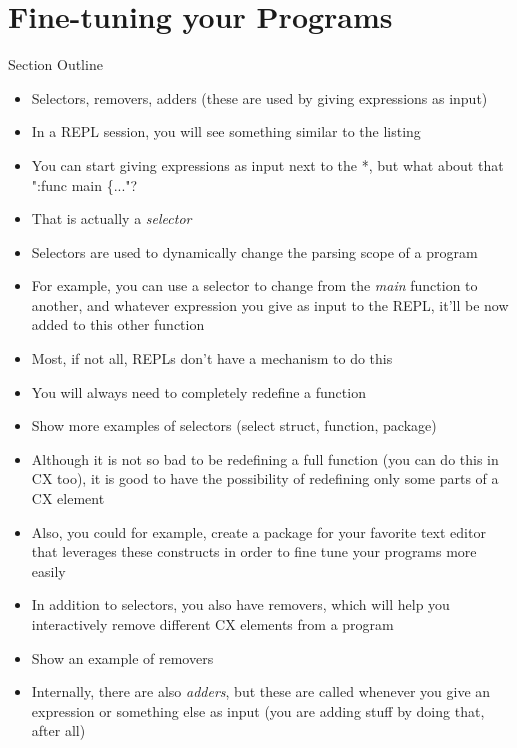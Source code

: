\documentclass[11pt,fleqn,openany]{book} %
\begin{document}
\section{Fine-tuning your Programs}

\begin{remark}
Section Outline
    \begin{itemize}
    	\item Selectors, removers, adders (these are used by giving expressions as input)
        \item In a REPL session, you will see something similar to the listing
        \item You can start giving expressions as input next to the *, but what about that ":func main \-\{..."?
        \item That is actually a \textit{selector}
        \item Selectors are used to dynamically change the parsing scope of a program
        \item For example, you can use a selector to change from the \textit{main} function to another, and whatever expression you give as input to the REPL, it'll be now added to this other function
        \item Most, if not all, REPLs don't have a mechanism to do this
        \item You will always need to completely redefine a function
        \item Show more examples of selectors (select struct, function, package)
        \item Although it is not so bad to be redefining a full function (you can do this in CX too), it is good to have the possibility of redefining only some parts of a CX element
        \item Also, you could for example, create a package for your favorite text editor that leverages these constructs in order to fine tune your programs more easily
        \item In addition to selectors, you also have removers, which will help you interactively remove different CX elements from a program
        \item Show an example of removers
        \item Internally, there are also \textit{adders}, but these are called whenever you give an expression or something else as input (you are adding stuff by doing that, after all)
    \end{itemize}
\end{remark}
\end{document}
